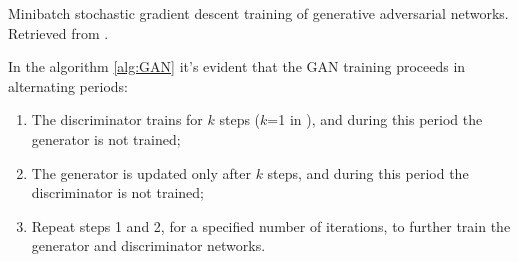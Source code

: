 \begin{algorithm}
  \scriptsize
  \caption[Minibatch stochastic gradient descent training of generative adversarial networks.]{Minibatch stochastic gradient descent training of generative adversarial networks. Retrieved from \cite{GAN_original}.}\label{alg:GAN}
\end{algorithm}


In the algorithm \ref{alg:GAN} it's evident that the \ac{GAN} training proceeds in alternating periods:

\begin{enumerate}
  \item The discriminator trains for $k$ steps ($k$=1 in \cite{GAN_original}), and during this period the generator is not trained;
  \item The generator is updated only after $k$ steps, and during this period the discriminator is not trained; 
  \item Repeat steps 1 and 2, for a specified number of iterations, to further train the generator and discriminator networks.
\end{enumerate}

